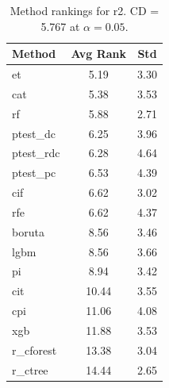 \begin{table}[h]
\centering
\caption{Method rankings for r2. CD = 5.767 at $\alpha=0.05$.}
\label{tab:ranks_r2}
\begin{tabular}{lcc}
\toprule
Method & Avg Rank & Std \\
\midrule
et & 5.19 & 3.30 \\
cat & 5.38 & 3.53 \\
rf & 5.88 & 2.71 \\
ptest_dc & 6.25 & 3.96 \\
ptest_rdc & 6.28 & 4.64 \\
ptest_pc & 6.53 & 4.39 \\
cif & 6.62 & 3.02 \\
rfe & 6.62 & 4.37 \\
boruta & 8.56 & 3.46 \\
lgbm & 8.56 & 3.66 \\
pi & 8.94 & 3.42 \\
cit & 10.44 & 3.55 \\
cpi & 11.06 & 4.08 \\
xgb & 11.88 & 3.53 \\
r_cforest & 13.38 & 3.04 \\
r_ctree & 14.44 & 2.65 \\
\bottomrule
\end{tabular}
\end{table}
